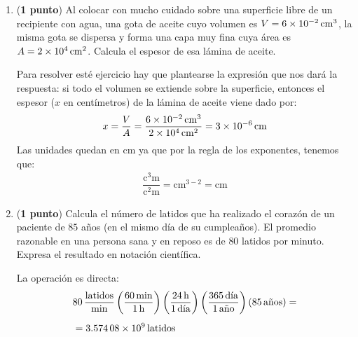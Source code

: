 \documentclass[14pt]{extarticle}
\begin{document}
\begin{enumerate}
\begin{enumerate}
Debemos de ocupar la expresión que ya conocemos:
\begin{align*}
\rho = \dfrac{m}{V} \hspace{0.3cm} \Rightarrow \hspace{0.3cm} m = \rho \, V
\end{align*}
Sustituimos los valores que ya tenemos:
\begin{align*}
m = \left( \SI[per-mode=fraction]{1.20}{\kilo\gram\per\cubic\meter} \right) \left( \SI{9.6d3}{\cubic\meter} \right) = \SI{1.152d4}{\kilo\gram}
\end{align*}
Este resulta queda expresado en kilogramos, pero nos piden la masa del aire contenido en el auditorio en libras, por lo que hay que hacer la conversión, el factor de libras a \unit{\kilo\gram} es conocido:
\begin{align*}
1 \, \text{libra} = \SI{0.45359}{\kilo\gram}
\end{align*}
Por lo que la conversión a realizar es:
\begin{align*}
m = \SI{1.152d4}{\kilo\gram} \left( \dfrac{1 \, \text{libra}}{\SI{0.45359}{\kilo\gram}} \right) = \num{2.5397d4} \, \text{libras}
\end{align*}
\end{enumerate}
\item (\textbf{1 punto}) Al colocar con mucho cuidado sobre una superficie libre de un recipiente con agua, una gota de aceite cuyo volumen es $V = \SI{6d-2}{\cubic\centi\meter}$, la misma gota se dispersa y forma una capa muy fina cuya área es $A = \SI{2d4}{\square\centi\meter}$. Calcula el espesor de esa lámina de aceite.

Para resolver esté ejercicio hay que plantearse la expresión que nos dará la respuesta: si todo el volumen se extiende sobre la superficie, entonces el espesor ($x$ en centímetros) de la lámina de aceite viene dado por:
\begin{align*}
x = \dfrac{V}{A} = \dfrac{\SI{6d-2}{\cubic\centi\meter}}{\SI{2d4}{\square\centi\meter}} = \SI{3d-6}{\centi\meter}
\end{align*}
Las unidades quedan en \unit{\centi\meter} ya que por la regla de los exponentes, tenemos que:
\begin{align*}
\dfrac{\unit{\cubic\centi\meter}}{\unit{\square\centi\meter}} = \unit{\centi\meter}^{3-2} = \unit{\centi\meter}
\end{align*}
\item (\textbf{1 punto}) Calcula el número de latidos que ha realizado el corazón de un paciente de $85$ años (en el mismo día de su cumpleaños). El promedio razonable en una persona sana y en reposo es de $80$ latidos por minuto. Expresa el resultado en notación científica.

La operación es directa:
\begin{align*}
&80 \, \dfrac{\text{latidos}}{\unit{\minute}} \left( \dfrac{\SI{60}{\minute}}{\SI{1}{\hour}} \right) \left( \dfrac{\SI{24}{\hour}}{1 \, \text{día}} \right) \left(\dfrac{\num{365} \, \text{día}}{1 \, \text{año}} \right) \left( \num{85} \, \text{años} \right) = \\[0.5em]
&= \num{3.57408d9} \, \text{latidos}
\end{align*}
\end{enumerate}
\end{document}
